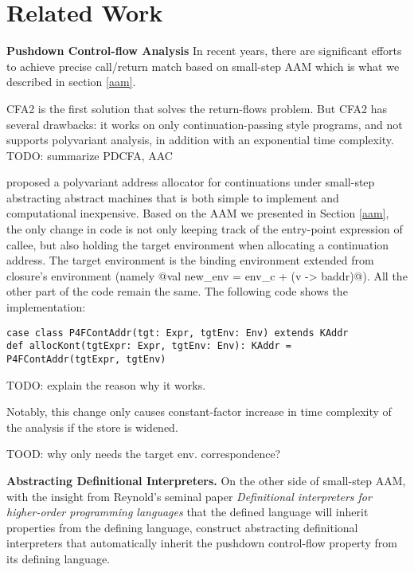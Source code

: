\documentclass[acmsmall,review,anonymous]{acmart}\settopmatter{printfolios=true,printccs=false,printacmref=false}
\begin{document}

\section{Related Work}

\textbf{Pushdown Control-flow Analysis}
In recent years, there are significant efforts \cite{vardoulakis2010cfa2, earl2012introspective, 
gilray2016pushdown, johnson2015abstracting} to achieve precise call/return 
match based on small-step AAM which is what we described in section \ref{aam}.

CFA2 is the first solution that solves the return-flows problem\cite{vardoulakis2010cfa2}.
But CFA2 has several drawbacks: it works on only continuation-passing style programs, 
and not supports polyvariant analysis, in addition with an exponential time complexity.
TODO: summarize PDCFA, AAC

\citeauthor{gilray2016pushdown} proposed a polyvariant address allocator for continuations
under small-step abstracting abstract machines that is both simple to implement and
computational inexpensive. 
Based on the AAM we presented in Section \ref{aam}, the only change in code is
not only keeping track of the entry-point expression of callee, but also holding the target environment
when allocating a continuation address.
The target environment is the binding environment extended from closure's environment
(namely @val new_env = env_c + (v -> baddr)@). All the other part of the code remain the same.
The following code shows the implementation:

\begin{lstlisting}
case class P4FContAddr(tgt: Expr, tgtEnv: Env) extends KAddr
def allocKont(tgtExpr: Expr, tgtEnv: Env): KAddr = P4FContAddr(tgtExpr, tgtEnv)
\end{lstlisting}

TODO: explain the reason why it works.

Notably, this change only causes constant-factor increase in time complexity of 
the analysis if the store is widened.

TOOD: why only needs the target env. correspondence?

\textbf{Abstracting Definitional Interpreters.}
On the other side of small-step AAM, with the insight from Reynold's seminal paper 
\emph{Definitional interpreters for higher-order programming languages} \cite{reynolds1972definitional}
that the defined language will inherit properties from the defining language, 
\citeauthor{darais2017abstracting} construct abstracting 
definitional interpreters that automatically inherit the pushdown control-flow 
property from its defining language.
\end{document}
